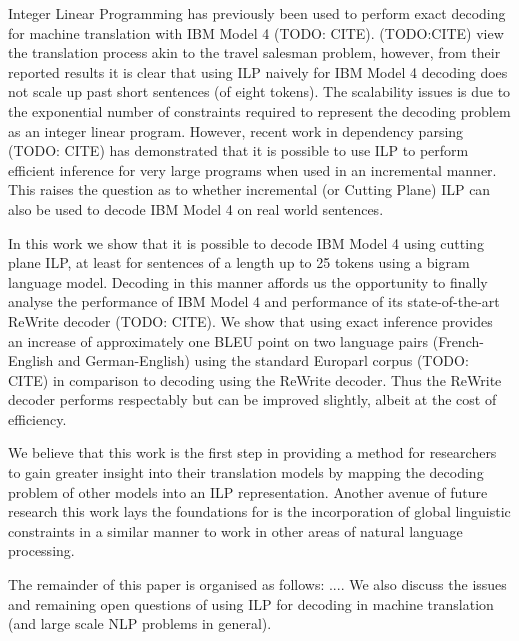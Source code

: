 Integer Linear Programming has previously been used to perform exact
decoding for machine translation with IBM Model 4 (TODO: CITE).
(TODO:CITE) view the translation process akin to the travel salesman
problem, however, from their reported results it is clear that using
ILP naively for IBM Model 4 decoding does not scale up past short
sentences (of eight tokens).  The scalability issues is due to the
exponential number of constraints required to represent the decoding
problem as an integer linear program.  However, recent work in
dependency parsing (TODO: CITE) has demonstrated that it is possible
to use ILP to perform efficient inference for very large programs when
used in an incremental manner.  This raises the question as to whether
incremental (or Cutting Plane) ILP can also be used to decode IBM
Model 4 on real world sentences.

In this work we show that it is possible to decode IBM Model 4 using
cutting plane ILP, at least for sentences of a length up to 25 tokens
using a bigram language model.  Decoding in this manner affords us the
opportunity to finally analyse the performance of IBM Model 4 and
performance of its state-of-the-art ReWrite decoder (TODO: CITE).  We
show that using exact inference provides an increase of approximately
one BLEU point on two language pairs (French-English and
German-English) using the standard Europarl corpus (TODO: CITE) in
comparison to decoding using the ReWrite decoder.  Thus the ReWrite
decoder performs respectably but can be improved slightly, albeit at
the cost of efficiency.

We believe that this work is the first step in providing a method for
researchers to gain greater insight into their translation models by
mapping the decoding problem of other models into an ILP
representation.  Another avenue of future research this work lays the
foundations for is the incorporation of global linguistic constraints
in a similar manner to work in other areas of natural language
processing.

The remainder of this paper is organised as follows: ....  We also
discuss the issues and remaining open questions of using ILP for
decoding in machine translation (and large scale NLP problems in
general).



